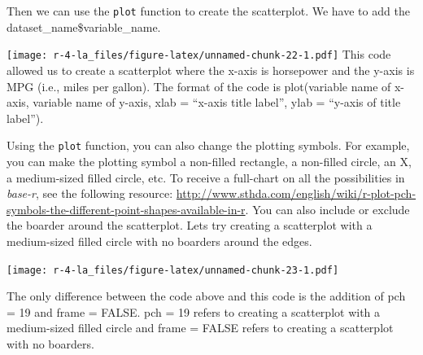 \documentclass[
]{book}
\newenvironment{Shaded}{\begin{snugshade}}{\end{snugshade}}
\newcommand{\AttributeTok}[1]{\textcolor[rgb]{0.77,0.63,0.00}{#1}}
\newcommand{\ConstantTok}[1]{\textcolor[rgb]{0.00,0.00,0.00}{#1}}
\newcommand{\DecValTok}[1]{\textcolor[rgb]{0.00,0.00,0.81}{#1}}
\newcommand{\FunctionTok}[1]{\textcolor[rgb]{0.00,0.00,0.00}{#1}}
\newcommand{\NormalTok}[1]{#1}
\newcommand{\SpecialCharTok}[1]{\textcolor[rgb]{0.00,0.00,0.00}{#1}}
\newcommand{\StringTok}[1]{\textcolor[rgb]{0.31,0.60,0.02}{#1}}
\begin{document}
Then we can use the \texttt{plot} function to create the scatterplot. We have to add the dataset\_name\$variable\_name.

\begin{Shaded}
\end{Shaded}

\texttt{[image: r-4-la\_files/figure-latex/unnamed-chunk-22-1.pdf]}
This code allowed us to create a scatterplot where the x-axis is horsepower and the y-axis is MPG (i.e., miles per gallon). The format of the code is plot(variable name of x-axis, variable name of y-axis, xlab = ``x-axis title label'', ylab = ``y-axis of title label'').

Using the \texttt{plot} function, you can also change the plotting symbols. For example, you can make the plotting symbol a non-filled rectangle, a non-filled circle, an X, a medium-sized filled circle, etc. To receive a full-chart on all the possibilities in \emph{base-r}, see the following resource: \url{http://www.sthda.com/english/wiki/r-plot-pch-symbols-the-different-point-shapes-available-in-r}. You can also include or exclude the boarder around the scatterplot. Lets try creating a scatterplot with a medium-sized filled circle with no boarders around the edges.

\begin{Shaded}
\end{Shaded}

\texttt{[image: r-4-la\_files/figure-latex/unnamed-chunk-23-1.pdf]}

The only difference between the code above and this code is the addition of pch = 19 and frame = FALSE. pch = 19 refers to creating a scatterplot with a medium-sized filled circle and frame = FALSE refers to creating a scatterplot with no boarders.
\end{document}
